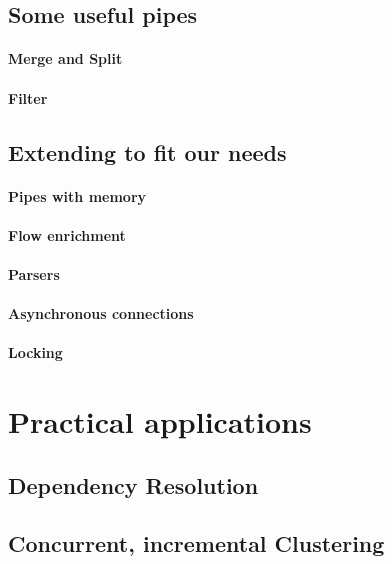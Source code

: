 \subsection{Some useful pipes}

\paragraph{Merge and Split}

\paragraph{Filter}

\subsection{Extending to fit our needs}

\paragraph{Pipes with memory} 

\paragraph{Flow enrichment}

\paragraph{Parsers}

\paragraph{Asynchronous connections}

\paragraph{Locking}

\section{Practical applications}

\subsection{Dependency Resolution}

\subsection{Concurrent, incremental Clustering}

